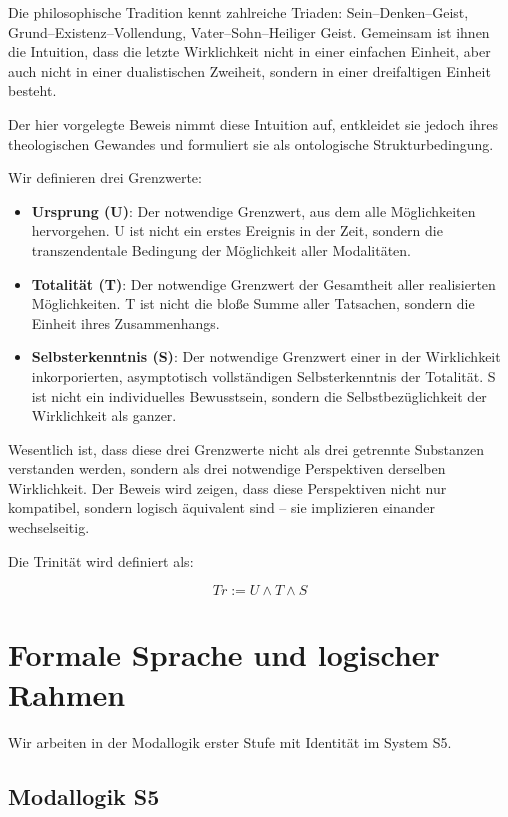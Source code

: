 \documentclass[
]{article}
\begin{document}
Die philosophische Tradition kennt zahlreiche Triaden: Sein--Denken--Geist, Grund--Existenz--Vollendung, Vater--Sohn--Heiliger Geist. Gemeinsam ist ihnen die Intuition, dass die letzte Wirklichkeit nicht in einer einfachen Einheit, aber auch nicht in einer dualistischen Zweiheit, sondern in einer dreifaltigen Einheit besteht.

Der hier vorgelegte Beweis nimmt diese Intuition auf, entkleidet sie jedoch ihres theologischen Gewandes und formuliert sie als ontologische Strukturbedingung.

Wir definieren drei Grenzwerte:

\begin{itemize}
\item \textbf{Ursprung (U)}: Der notwendige Grenzwert, aus dem alle Möglichkeiten hervorgehen. U ist nicht ein erstes Ereignis in der Zeit, sondern die transzendentale Bedingung der Möglichkeit aller Modalitäten.
\item \textbf{Totalität (T)}: Der notwendige Grenzwert der Gesamtheit aller realisierten Möglichkeiten. T ist nicht die bloße Summe aller Tatsachen, sondern die Einheit ihres Zusammenhangs.
\item \textbf{Selbsterkenntnis (S)}: Der notwendige Grenzwert einer in der Wirklichkeit inkorporierten, asymptotisch vollständigen Selbsterkenntnis der Totalität. S ist nicht ein individuelles Bewusstsein, sondern die Selbstbezüglichkeit der Wirklichkeit als ganzer.
\end{itemize}

Wesentlich ist, dass diese drei Grenzwerte nicht als drei getrennte Substanzen verstanden werden, sondern als drei notwendige Perspektiven derselben Wirklichkeit. Der Beweis wird zeigen, dass diese Perspektiven nicht nur kompatibel, sondern logisch äquivalent sind -- sie implizieren einander wechselseitig.

Die Trinität wird definiert als:

\[
Tr := U \land T \land S
\]

\section{Formale Sprache und logischer Rahmen}\label{formale-sprache-und-logischer-rahmen}

Wir arbeiten in der Modallogik erster Stufe mit Identität im System S5.

\subsection{Modallogik S5}\label{modallogik-s5}
\end{document}
